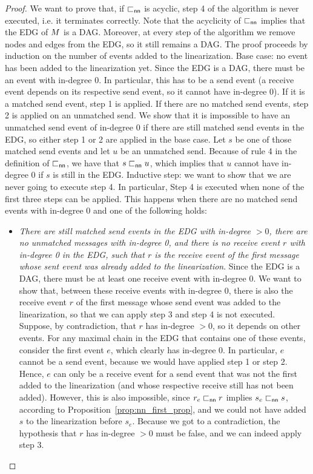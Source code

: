 \nnalgotermination*
\begin{proof}
We want to prove that, if $\sqsubset_{\mathsf{nn}}$ is acyclic, step 4 of the algorithm is never executed, i.e. it terminates correctly. Note that the acyclicity of $\sqsubset_{\mathsf{nn}}$ implies that the EDG of $M$ is a DAG. Moreover, at every step of the algorithm we remove nodes and edges from the EDG, so it still remains a DAG. The proof proceeds by induction on the number of events added to the linearization.\newline
Base case: no event has been added to the linearization yet. Since the EDG is a DAG, there must be an event with in-degree 0. In particular, this has to be a send event (a receive event depends on its respective send event, so it cannot have in-degree 0). If it is a matched send event, step 1 is applied. If there are no matched send events, step 2 is applied on an unmatched send. We show that it is impossible to have an unmatched send event of in-degree 0 if there are still matched send events in the EDG, so either step 1 or 2 are applied in the base case. Let $s$ be one of those matched send events and let $u$ be an unmatched send. Because of rule 4 in the definition of $\sqsubset_{\mathsf{nn}}$, we have that $s \sqsubset_{\mathsf{nn}} u$, which implies that $u$ cannot have in-degree 0 if $s$ is still in the EDG.\newline
Inductive step: we want to show that we are never going to execute step 4. In particular, Step 4 is executed when none of the first three steps can be applied. This happens when there are no matched send events with in-degree 0 and one of the following holds:
\begin{itemize}%
	\item \emph{There are still matched send events in the EDG with in-degree $>0$, there are no unmatched messages with in-degree 0, and there is no receive event $r$ with in-degree 0 in the EDG, such that $r$ is the receive event of the first message whose sent event was already added to the linearization}. Since the EDG is a DAG, there must be at least one receive event with in-degree 0. We want to show that, between these receive events with in-degree 0, there is also the receive event $r$ of the first message whose send event was added to the linearization, so that we can apply step 3 and step 4 is not executed. Suppose, by contradiction, that $r$ has in-degree $>0$, so it depends on other events. For any maximal chain in the EDG that contains one of these events, consider the first event $e$, which clearly has in-degree 0. In particular, $e$ cannot be a send event, because we would have applied step 1 or step 2. Hence, $e$ can only be a receive event for a send event that was not the first added to the linearization (and whose respective receive still has not been added). However, this is also impossible, since $r_e \sqsubset_{\mathsf{nn}} r$ implies $s_e \sqsubset_{\mathsf{nn}} s$, according to Proposition~\ref{prop:nn_first_prop}, and we could not have added $s$ to the linearization before $s_e$. Because we got to a contradiction, the hypothesis that $r$ has in-degree $>0$ must be false, and we can indeed apply step 3.

\end{itemize}
\end{proof}
